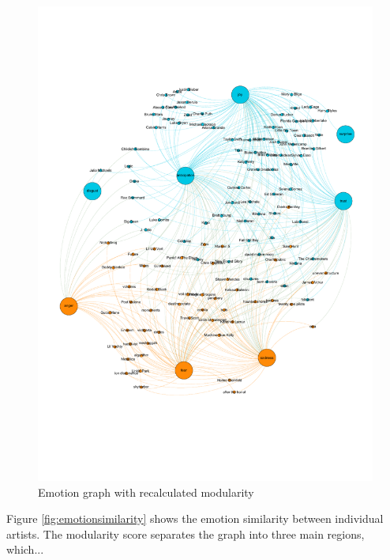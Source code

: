 \documentclass[10pt,a4paper]{article}
\begin{document}
		\begin{figure}[htb]
			\centering
			\includegraphics[trim=0mm 50mm 0mm 30mm, clip, width=\linewidth]{data/emotion_graph_new_modularity}
			\caption{Emotion graph with recalculated modularity}
			\label{fig:emotionnewmod}
		\end{figure}
		
		Figure \ref{fig:emotionsimilarity} shows the emotion similarity between individual artists. The modularity score separates the graph into three main regions, which...
		
\end{document}
